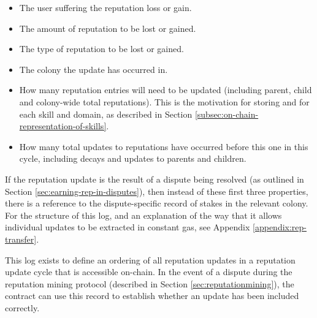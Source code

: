 \begin{itemize}
\item The user suffering the reputation loss or gain.
\item The amount of reputation to be lost or gained.
\item The type of reputation to be lost or gained.
\item The colony the update has occurred in.
\item How many reputation entries will need to be updated (including parent, child and colony-wide total reputations). This is the motivation for storing  and  for each skill and domain, as described in Section \ref{subsec:on-chain-representation-of-skills}.
\item How many total updates to reputations have occurred before this one in this cycle, including decays and updates to parents and children.
\end{itemize}

If the reputation update is the result of a dispute being resolved (as outlined in Section \ref{sec:earning-rep-in-disputes}), then instead of these first three properties, there is a reference to the dispute-specific record of stakes in the relevant colony. For the structure of this log, and an explanation of the way that it allows individual updates to be extracted in constant gas, see Appendix \ref{appendix:rep-transfer}.

This log exists to define an ordering of all reputation updates in a reputation update cycle that is accessible on-chain. In the event of a dispute during the reputation mining protocol (described in Section \ref{sec:reputationmining}), the  contract can use this record to establish whether an update has been included correctly.
